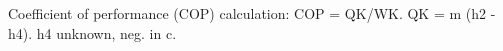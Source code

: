 Coefficient of performance (COP) calculation:  
COP = QK/WK.  
QK = m (h2 - h4).  
h4 unknown, neg. in c.